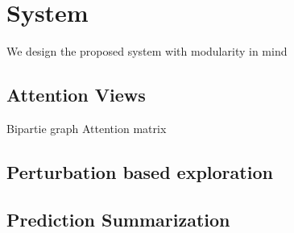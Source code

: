 \section{System}
We design the proposed system with modularity in mind

\subsection{Attention Views}
Bipartie graph
Attention matrix


\subsection{Perturbation based exploration}
\label{sec:perturb}

\subsection{Prediction Summarization}



